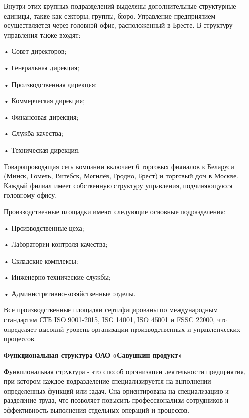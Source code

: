 {  \par \redline Внутри этих крупных подразделений выделены дополнительные структурные единицы, такие как секторы, группы, бюро. Управление предприятием осуществляется через головной офис, расположенный в Бресте. В структуру управления также входят:
  
  \par \redline • Совет директоров;
  \par \redline • Генеральная дирекция;
  \par \redline • Производственная дирекция;
  \par \redline • Коммерческая дирекция;
  \par \redline • Финансовая дирекция;
  \par \redline • Служба качества;
  \par \redline • Техническая дирекция.

  \par \redline Товаропроводящая сеть компании включает 6 торговых филиалов в Беларуси (Минск, Гомель, Витебск, Могилёв, Гродно, Брест) и торговый дом в Москве. Каждый филиал имеет собственную структуру управления, подчиняющуюся головному офису.

  \par \redline Производственные площадки имеют следующие основные подразделения:
  
  \par \redline • Производственные цеха;
  \par \redline • Лаборатории контроля качества;
  \par \redline • Складские комплексы;
  \par \redline • Инженерно-технические службы;
  \par \redline • Административно-хозяйственные отделы.

  \par \redline Все производственные площадки сертифицированы по международным стандартам СТБ ISO 9001-2015, ISO 14001, ISO 45001 и FSSC 22000, что определяет высокий уровень организации производственных и управленческих процессов.

  \par \redline \textbf{Функциональная структура ОАО «Савушкин продукт»}

  \par \redline Функциональная структура - это способ организации деятельности предприятия, при котором каждое подразделение специализируется на выполнении определенных функций или задач. Она ориентирована на специализацию и разделение труда, что позволяет повысить профессионализм сотрудников и эффективность выполнения отдельных операций и процессов.

}

